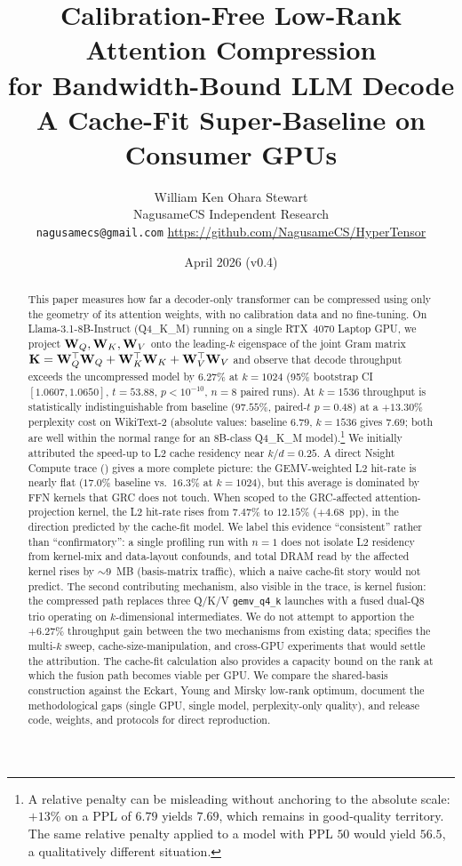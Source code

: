 \documentclass[11pt]{article}
\title{Calibration-Free Low-Rank Attention Compression\\
for Bandwidth-Bound LLM Decode\\[0.4em]
\large A Cache-Fit Super-Baseline on Consumer GPUs}
\author{William Ken Ohara Stewart\\
\small NagusameCS Independent Research\\
\small \texttt{nagusamecs@gmail.com} \quad \url{https://github.com/NagusameCS/HyperTensor}}
\date{April 2026 (v0.4)}
\begin{document}
\maketitle
\hypertensorbanner

\begin{abstract}
\noindent
This paper measures how far a decoder-only transformer can be compressed
using only the geometry of its attention weights, with no calibration data
and no fine-tuning. On Llama-3.1-8B-Instruct (Q4\_K\_M) running on a single
RTX~4070 Laptop GPU, we project $\mathbf{W}_Q,\mathbf{W}_K,\mathbf{W}_V$ onto the
leading-$k$ eigenspace of the joint Gram matrix
$\mathbf{K}=\mathbf{W}_Q^\top\mathbf{W}_Q+\mathbf{W}_K^\top\mathbf{W}_K+\mathbf{W}_V^\top\mathbf{W}_V$
and observe that decode throughput exceeds the uncompressed model
by $6.27\%$ at $k{=}1024$ (95\% bootstrap CI $[1.0607,1.0650]$, $t{=}53.88$,
$p<10^{-10}$, $n{=}8$ paired runs). At $k{=}1536$ throughput is
statistically indistinguishable from baseline ($97.55\%$, paired-$t$ $p{=}0.48$)
at a $+13.30\%$ perplexity cost on WikiText-2 (absolute values: baseline $6.79$, $k{=}1536$ gives $7.69$; both are well within the normal range for an 8B-class Q4\_K\_M model).\footnote{A relative penalty can be misleading without anchoring to the absolute scale: $+13\%$ on a PPL of $6.79$ yields $7.69$, which remains in good-quality territory. The same relative penalty applied to a model with PPL $50$ would yield $56.5$, a qualitatively different situation.}  We initially attributed the speed-up to L2 cache residency near $k/d{=}0.25$.
A direct Nsight Compute trace () gives a more complete
picture: the GEMV-weighted L2 hit-rate is nearly flat ($17.0\%$ baseline vs.\
$16.3\%$ at $k{=}1024$), but this average is dominated by FFN kernels that GRC
does not touch. When scoped to the GRC-affected attention-projection kernel,
the L2 hit-rate rises from $7.47\%$ to $12.15\%$ ($+4.68$~pp), in the
direction predicted by the cache-fit model. We label this evidence
``consistent'' rather than ``confirmatory'': a single profiling
run with $n{=}1$ does not isolate L2 residency from kernel-mix and
data-layout confounds, and total DRAM read by the affected kernel
rises by ${\sim}9$~MB (basis-matrix traffic), which a naive cache-fit
story would not predict. The second contributing mechanism, also visible in the trace,
is kernel fusion: the compressed path replaces three Q/K/V \texttt{gemv\_q4\_k}
launches with a fused dual-Q8 trio operating on $k$-dimensional intermediates.
We do not attempt to apportion the $+6.27\%$ throughput gain between the
two mechanisms from existing data; \Cref{sec:falsification} specifies the
multi-$k$ sweep, cache-size-manipulation, and cross-GPU experiments that
would settle the attribution. The cache-fit calculation also provides a
capacity bound on the rank at which the fusion path becomes
viable per GPU. We compare the shared-basis construction against the
Eckart, Young and Mirsky low-rank optimum, document the methodological
gaps (single GPU, single model, perplexity-only quality), and release code,
weights, and protocols for direct reproduction.
\end{abstract}
\end{document}
